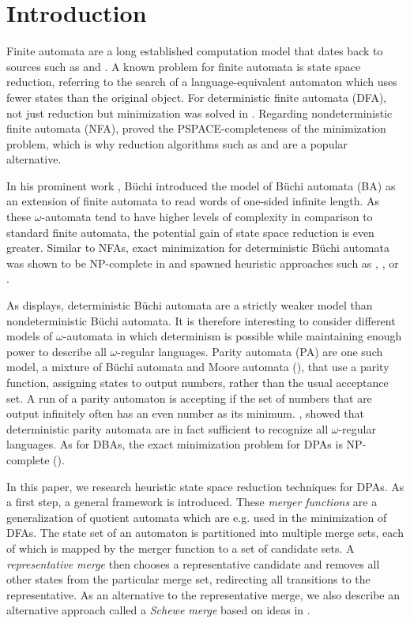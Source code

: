 \section*{Introduction}

Finite automata are a long established computation model that dates back to sources such as \cite{McCulloch1990} and \cite{RabinScott1959}. A known problem for finite automata is state space reduction, referring to the search of a language-equivalent automaton which uses fewer states than the original object. For deterministic finite automata (DFA), not just reduction but minimization was solved in \cite{Hopcroft1971}. Regarding nondeterministic finite automata (NFA), \cite{JianRavikumar1991} proved the PSPACE-completeness of the minimization problem, which is why reduction algorithms such as \cite{ChamparnaudCoulon2004} and \cite{BonchiPous2013} are a popular alternative.

In his prominent work \cite{Buchi1966}, B\"uchi introduced the model of B\"uchi automata (BA) as an extension of finite automata to read words of one-sided infinite length. As these $\omega$-automata tend to have higher levels of complexity in comparison to standard finite automata, the potential gain of state space reduction is even greater. Similar to NFAs, exact minimization for deterministic B\"uchi automata was shown to be NP-complete in \cite{Schewe2010} and spawned heuristic approaches such as \cite{Schewe2010}, \cite{MayrClemente2012}, or \cite{EtessamiWilkeSchuller2001}. 

As \cite{Thomas1991} displays, deterministic B\"uchi automata are a strictly weaker model than nondeterministic Büchi automata. It is therefore interesting to consider different models of $\omega$-automata in which determinism is possible while maintaining enough power to describe all $\omega$-regular languages. Parity automata (PA) are one such model, a mixture of B\"uchi automata and Moore automata (\cite{Moore56}), that use a parity function, assigning states to output numbers, rather than the usual acceptance set. A run of a parity automaton is accepting if the set of numbers that are output infinitely often has an even number as its minimum.
\cite{Mostowski1991}, \cite{Thomas1997} showed that deterministic parity automata are in fact sufficient to recognize all $\omega$-regular languages. As for DBAs, the exact minimization problem for DPAs is NP-complete (\cite{Schewe2010}).
\vspace{5pt}

In this paper, we research heuristic state space reduction techniques for DPAs. As a first step, a general framework is introduced. These \emph{merger functions} are a generalization of quotient automata which are e.g. used in the minimization of DFAs. The state set of an automaton is partitioned into multiple merge sets, each of which is mapped by the merger function to a set of candidate sets. A \emph{representative merge} then chooses a representative candidate and removes all other states from the particular merge set, redirecting all transitions to the representative. As an alternative to the representative merge, we also describe an alternative approach called a \emph{Schewe merge} based on ideas in \cite{Schewe2010}.

